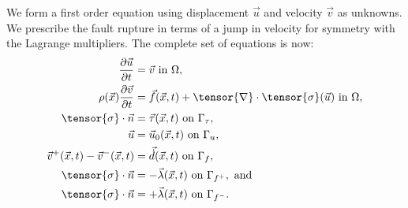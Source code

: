 We form a first order equation using displacement $\vec{u}$ and
velocity $\vec{v}$ as unknowns. We prescribe the fault rupture in
terms of a jump in velocity for symmetry with the Lagrange
multipliers. The complete set of equations is now:
\begin{align}
  \frac{\partial \vec{u}}{\partial t} &= \vec{v} \text{ in } \Omega, \\
  \rho(\vec{x}) \frac{\partial\vec{v}}{\partial t} &= \vec{f}(\vec{x},t) + \tensor{\nabla} \cdot \tensor{\sigma}(\vec{u}) \text{ in } \Omega, \\
  \tensor{\sigma} \cdot \vec{n} &= \vec{\tau}(\vec{x},t) \text{ on } \Gamma_\tau, \\
  \vec{u} &= \vec{u}_0(\vec{x},t) \text{ on } \Gamma_u, \\
  \vec{v}^+(\vec{x},t) - \vec{v}^-(\vec{x},t) &= \vec{\dot{d}}(\vec{x},t) \text{ on } \Gamma_f, \\
  \tensor{\sigma} \cdot \vec{n} &= -\vec{\lambda}(\vec{x},t) \text{ on }\Gamma_{f^+}, \text{ and} \\
  \tensor{\sigma} \cdot \vec{n} &= +\vec{\lambda}(\vec{x},t) \text{ on }\Gamma_{f^-}.
\end{align}

